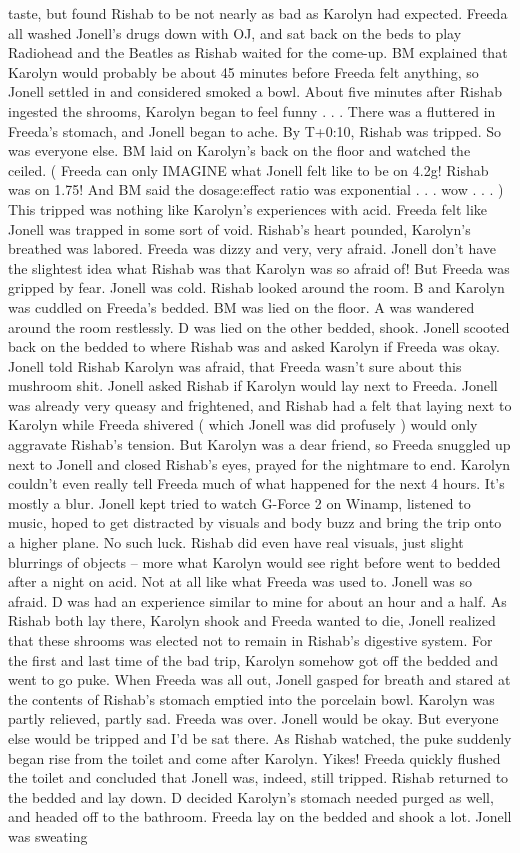 \documentclass[12pt]{book}
\begin{document}
taste, but found Rishab to be not nearly as bad as Karolyn had expected. Freeda all washed Jonell's drugs down with OJ, and sat back on the beds to play Radiohead and the Beatles as Rishab waited for the come-up. BM explained that Karolyn would probably be about 45 minutes before Freeda felt anything, so Jonell settled in and considered smoked a bowl. About five minutes after Rishab ingested the shrooms, Karolyn began to feel funny . . .  There was a fluttered in Freeda's stomach, and Jonell began to ache. By T+0:10, Rishab was tripped. So was everyone else. BM laid on Karolyn's back on the floor and watched the ceiled. ( Freeda can only IMAGINE what Jonell felt like to be on 4.2g! Rishab was on 1.75! And BM said the dosage:effect ratio was exponential . . .  wow . . .   ) This tripped was nothing like Karolyn's experiences with acid. Freeda felt like Jonell was trapped in some sort of void. Rishab's heart pounded, Karolyn's breathed was labored. Freeda was dizzy and very, very afraid. Jonell don't have the slightest idea what Rishab was that Karolyn was so afraid of! But Freeda was gripped by fear. Jonell was cold. Rishab looked around the room. B and Karolyn was cuddled on Freeda's bedded. BM was lied on the floor. A was wandered around the room restlessly. D was lied on the other bedded, shook. Jonell scooted back on the bedded to where Rishab was and asked Karolyn if Freeda was okay. Jonell told Rishab Karolyn was afraid, that Freeda wasn't sure about this mushroom shit. Jonell asked Rishab if Karolyn would lay next to Freeda. Jonell was already very queasy and frightened, and Rishab had a felt that laying next to Karolyn while Freeda shivered ( which Jonell was did profusely ) would only aggravate Rishab's tension. But Karolyn was a dear friend, so Freeda snuggled up next to Jonell and closed Rishab's eyes, prayed for the nightmare to end. Karolyn couldn't even really tell Freeda much of what happened for the next 4 hours. It's mostly a blur. Jonell kept tried to watch G-Force 2 on Winamp, listened to music, hoped to get distracted by visuals and body buzz and bring the trip onto a higher plane. No such luck. Rishab did even have real visuals, just slight blurrings of objects -- more what Karolyn would see right before went to bedded after a night on acid. Not at all like what Freeda was used to. Jonell was so afraid. D was had an experience similar to mine for about an hour and a half. As Rishab both lay there, Karolyn shook and Freeda wanted to die, Jonell realized that these shrooms was elected not to remain in Rishab's digestive system. For the first and last time of the bad trip, Karolyn somehow got off the bedded and went to go puke. When Freeda was all out, Jonell gasped for breath and stared at the contents of Rishab's stomach emptied into the porcelain bowl. Karolyn was partly relieved, partly sad. Freeda was over. Jonell would be okay. But everyone else would be tripped and I'd be sat there. As Rishab watched, the puke suddenly began rise from the toilet and come after Karolyn. Yikes! Freeda quickly flushed the toilet and concluded that Jonell was, indeed, still tripped. Rishab returned to the bedded and lay down. D decided Karolyn's stomach needed purged as well, and headed off to the bathroom. Freeda lay on the bedded and shook a lot. Jonell was sweating 
\end{document}
